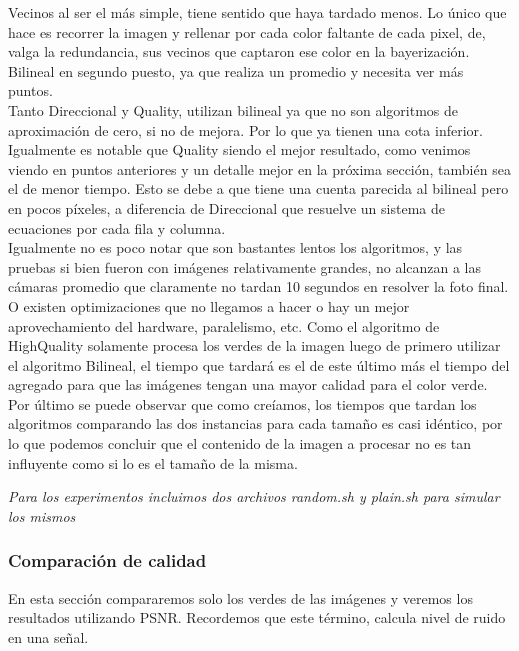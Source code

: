 {Vecinos al ser el más simple, tiene sentido que haya tardado menos. Lo único que hace es recorrer la imagen y rellenar por cada color faltante de cada pixel, de, valga la redundancia, sus vecinos que captaron ese color en la bayerización. Bilineal en segundo puesto, ya que realiza un promedio y necesita ver más puntos. \\
Tanto Direccional y Quality, utilizan bilineal ya que no son algoritmos de aproximación de cero, si no de mejora. Por lo que ya tienen una cota inferior. Igualmente es notable que Quality siendo el mejor resultado, como venimos viendo en puntos anteriores y un detalle mejor en la próxima sección, también sea el de menor tiempo. Esto se debe a que tiene una cuenta parecida al bilineal pero en pocos píxeles, a diferencia de Direccional que resuelve un sistema de ecuaciones por cada fila y columna.\\
Igualmente no es poco notar que son bastantes lentos los algoritmos, y las pruebas si bien fueron con imágenes relativamente grandes, no alcanzan a las cámaras promedio que claramente no tardan 10 segundos en resolver la foto final. O existen optimizaciones que no llegamos a hacer o hay un mejor aprovechamiento del hardware, paralelismo, etc.
Como el algoritmo de HighQuality solamente procesa los verdes de la imagen luego de primero utilizar el algoritmo Bilineal, el tiempo que tardará es el de este último más el tiempo del agregado para que las imágenes tengan una mayor calidad para el color verde.
Por último se puede observar que como creíamos, los tiempos que tardan los algoritmos comparando las dos instancias para cada tamaño es casi idéntico, por lo que podemos concluir que el contenido de la imagen a procesar no es tan influyente como si lo es el tamaño de la misma.  

\textit{Para los experimentos incluimos dos archivos random.sh y plain.sh para simular los mismos}


\subsubsection{Comparación de calidad}
En esta sección compararemos solo los verdes de las imágenes y veremos los resultados utilizando PSNR. Recordemos que este término, calcula nivel de ruido en una señal.

}
